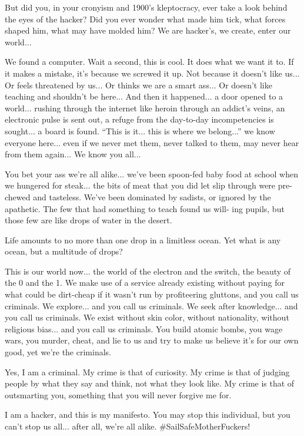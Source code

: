 \documentclass[letterpaper,12pt,english]{sphinxmanual}
\begin{document}
But did you, in your cronyism and 1900's kleptocracy, ever
take a look behind the eyes of the hacker? Did you ever wonder what
made him tick, what forces shaped him, what may have molded him?
We are hacker's, we create, enter our world...

We found a computer. Wait a second, this is
cool. It does what we want it to. If it makes a mistake,
it's because we screwed it up. Not because it doesn't like us...
Or feels threatened by us...
Or thinks we are a smart ass...
Or doesn't like teaching and shouldn't be here...
And then it happened... a door opened to a world... rushing through
the internet like heroin through an addict's veins, an electronic pulse is
sent out, a refuge from the day-to-day incompetencies is sought... a board is
found.
``This is it... this is where we belong...''
we know everyone here... even if we never met them, never talked to
them, may never hear from them again... We know you all...

You bet your ass we're all alike... we've been spoon-fed baby food at
school when we hungered for steak... the bits of meat that you did let slip
through were pre-chewed and tasteless. We've been dominated by sadists, or
ignored by the apathetic. The few that had something to teach found us will-
ing pupils, but those few are like drops of water in the desert.

Life amounts to no more than one drop in a limitless ocean.
Yet what is any ocean,
but a multitude of drops?

This is our world now... the world of the electron and the switch, the
beauty of the 0 and the 1. We make use of a service already existing without paying
for what could be dirt-cheap if it wasn't run by profiteering gluttons, and
you call us criminals. We explore... and you call us criminals. We seek
after knowledge... and you call us criminals. We exist without skin color,
without nationality, without religious bias... and you call us criminals.
You build atomic bombs, you wage wars, you murder, cheat, and lie to us
and try to make us believe it's for our own good, yet we're the criminals.

Yes, I am a criminal. My crime is that of curiosity. My crime is
that of judging people by what they say and think, not what they look like.
My crime is that of outsmarting you, something that you will never forgive me
for.

I am a hacker, and this is my manifesto. You may stop this individual,
but you can't stop us all... after all, we're all alike.
\#SailSafeMotherFuckers!
\end{document}
